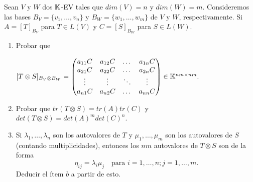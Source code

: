 \item Sean $V$ y $W$ dos $\mathbb{K}$-EV tales que $dim(V)=n$ y $dim(W)=m$. Consideremos las bases $B_V=\{v_1,\dots,v_n\}$ y $B_W=\{w_1,\dots,w_m\}$ de $V$ y $W$, respectivamente. Si $A=[T]_{B_V}$ para $T\in L(V)$ y $C=[S]_{B_W}$ para $S\in L(W)$.
    \begin{enumerate}
        \item Probar que
            \begin{center}
                $[T\otimes S]_{B_V\otimes B_W}=\begin{pmatrix}
                    a_{11}C&a_{12}C&\dots&a_{1n}C\\
                    a_{21}C&a_{22}C&\dots&a_{2n}C\\
                    \vdots &\vdots &\ddots&\vdots\\
                    a_{n1}C&a_{n2}C&\dots&a_{nn}C
                \end{pmatrix}\in\mathbb{K}^{nm\times nm}.$
            \end{center}
            \begin{mdframed}[style=s]
                
            \end{mdframed}
        \item Probar que $tr(T\otimes S)=tr(A)tr(C)$ y $det(T\otimes S)=det(A)^mdet(C)^n$.
            \begin{mdframed}[style=s]
                
            \end{mdframed}
        \item Si $\lambda_1,\dots,\lambda_n$ son los autovalores de $T$ y $\mu_1,\dots,\mu_m$ son los autovalores de $S$ (contando multiplicidades), entonces los $nm$ autovalores de $T\otimes S$ son de la forma\[\eta_{ij}=\lambda_i\mu_j\quad\text{para }i=1,\dots,n;j=1,\dots,m.\]
            Deducir el ítem $b$ a partir de esto.
            \begin{mdframed}[style=s]
                
            \end{mdframed}
    \end{enumerate}